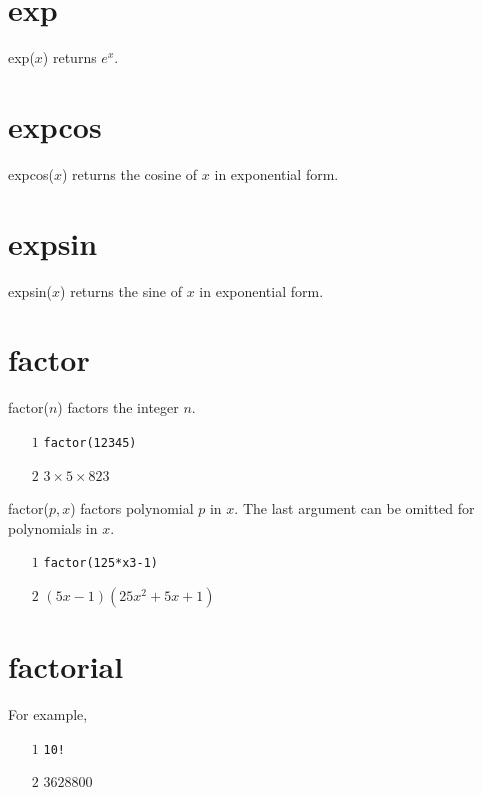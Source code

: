 \documentclass[12pt,openany]{report}
\begin{document}
\section*{exp}
exp($x$) returns $e^x$.

\section*{expcos}
expcos($x$) returns the cosine of $x$ in exponential form.

\section*{expsin}
expsin($x$) returns the sine of $x$ in exponential form.

\section*{factor}
factor($n$) factors the integer $n$.
\begin{itemize}
\item[$\scriptstyle1$]{\tt factor(12345)}
\item[$\scriptstyle2$]\hspace{50pt} $3\times 5\times 823$
\end{itemize}
%
factor($p,x$) factors polynomial $p$ in $x$.
The last argument can be omitted for polynomials in $x$.
\begin{itemize}
\item[$\scriptstyle1$]{\tt factor(125*x{}3-1)}
\item[$\scriptstyle2$]\hspace{50pt} $(5x-1)(25x^2+5x+1)$
\end{itemize}

\section*{factorial}
For example,
\begin{itemize}
\item[$\scriptstyle1$]{\tt 10!}
\item[$\scriptstyle2$]\hspace{50pt} $3628800$
\end{itemize}
\end{document}
